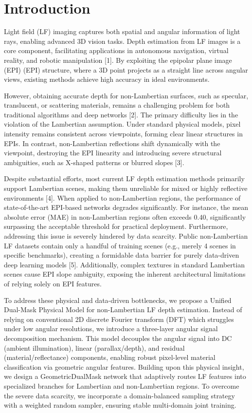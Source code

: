 \section{Introduction}

Light field (LF) imaging captures both spatial and angular information of light rays, enabling advanced 3D vision tasks. Depth estimation from LF images is a core component, facilitating applications in autonomous navigation, virtual reality, and robotic manipulation [1]. By exploiting the epipolar plane image (EPI) (EPI) structure, where a 3D point projects as a straight line across angular views, existing methods achieve high accuracy in ideal environments. 

However, obtaining accurate depth for non-Lambertian surfaces, such as specular, translucent, or scattering materials, remains a challenging problem for both traditional algorithms and deep networks [2]. The primary difficulty lies in the violation of the Lambertian assumption. Under standard physical models, pixel intensity remains consistent across viewpoints, forming clear linear structures in EPIs. In contrast, non-Lambertian reflections shift dynamically with the viewpoint, destroying the EPI linearity and introducing severe structural ambiguities, such as X-shaped patterns or blurred slopes [3]. 

Despite substantial efforts, most current LF depth estimation methods primarily support Lambertian scenes, making them unreliable for mixed or highly reflective environments [4]. When applied to non-Lambertian regions, the performance of state-of-the-art EPI-based networks degrades significantly. For instance, the mean absolute error (MAE) in non-Lambertian regions often exceeds 0.40, significantly surpassing the acceptable threshold for practical deployment. Furthermore, addressing this issue is severely hindered by data scarcity. Public non-Lambertian LF datasets contain only a handful of training scenes (e.g., merely 4 scenes in specific benchmarks), creating a formidable data barrier for purely data-driven deep learning models [5]. Additionally, complex textures in standard Lambertian scenes cause EPI slope ambiguity, exposing the inherent architectural limitations of relying solely on EPI features.

To address these physical and data-driven bottlenecks, we propose a Unified Dual-Mask Physical Model for non-Lambertian LF depth estimation. Instead of relying on conventional 2D discrete Fourier transform (DFT) which struggles under low angular resolutions, we introduce a three-layer angular signal decomposition mechanism. This model decouples the angular signal into DC (ambient illumination), linear (parallax/depth), and residual (material/reflectance) components, enabling robust pixel-level material classification via geometric angular features. Building upon this physical insight, we design a GeometricDualMask network that adaptively routes LF features into specialized branches for Lambertian and non-Lambertian regions. To overcome the severe data scarcity, we incorporate a domain-balanced sampling strategy with a weighted random sampler, ensuring stable multi-domain joint training.

